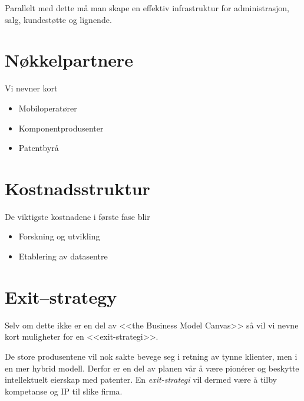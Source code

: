Parallelt med dette må man skape en effektiv infrastruktur for administrasjon,
salg, kundestøtte og lignende.

\section{Nøkkelpartnere}

Vi nevner kort

\begin{itemize}
  \item Mobiloperatører
  \item Komponentprodusenter
  \item Patentbyrå
\end{itemize}

\section{Kostnadsstruktur}

De viktigste kostnadene i første fase blir

\begin{itemize}
  \item Forskning og utvikling
  \item Etablering av datasentre
\end{itemize}


\section{Exit--strategy}

Selv om dette ikke er en del av <<the Business Model Canvas>> så vil vi nevne
kort muligheter for en <<exit-strategi>>.

De store produsentene vil nok sakte bevege seg i retning av tynne klienter, men
i en mer hybrid modell.  Derfor er en del av planen vår å være pionérer og
beskytte intellektuelt eierskap med patenter.  En \textit{exit-strategi} vil
dermed være å tilby kompetanse og IP til slike firma.
